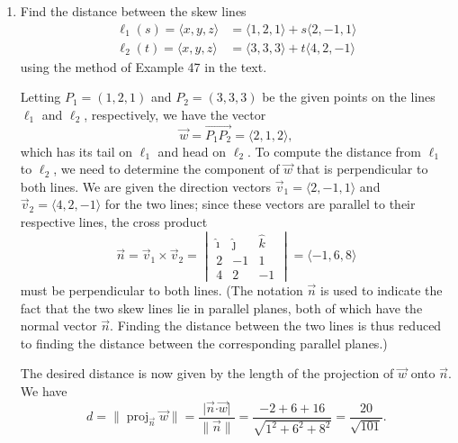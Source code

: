 \documentclass[12pt]{article}
\newcommand{\abs}[1]{\lvert #1\rvert}
\newcommand{\len}[1]{\lVert #1\rVert}
\newcommand{\dotp}{\boldsymbol{\cdot}}
\begin{document}
\begin{enumerate}
{\bf Note:} if we wanted only the distance but didn't need to find the point $P_1$, we can notice (from -- guess what? -- the diagram!) that the distance from the point $P$ to the line is given by the length of the vector $\overrightarrow{P_1P}$, and that 
\[
\overrightarrow{P_1P} = \overrightarrow{P_0P}-\overrightarrow{P_0P_1} = \langle -1, 3, -1\rangle - \langle -2, 2, 0\rangle = \langle 1, 1,  -1\rangle,
\]
and thus $d = \len{\overrightarrow{P_1P}} = \sqrt{1^2+1^2+(-1)^2} = \sqrt{3}$.

\newpage


\item Find the distance between the skew lines 
\begin{align*}
 \ell_1(s) = \langle x,y,z\rangle & = \langle 1,2,1\rangle+s\langle 2,-1,1\rangle\\
 \ell_2(t) = \langle x,y,z\rangle & = \langle 3,3,3\rangle+t\langle 4,2,-1\rangle
\end{align*}
using the method of Example 47 in the text. 

\bigskip

Letting $P_1 = (1,2,1)$ and $P_2=(3,3,3)$ be the given points on the lines $\ell_1$ and $\ell_2$, respectively, we have the vector 
\[
 \vec{w} = \overrightarrow{P_1P_2} = \langle 2,1,2\rangle,
\]
which has its tail on $\ell_1$ and head on $\ell_2$. To compute the distance from $\ell_1$ to $\ell_2$, we need to determine the component of $\vec{w}$ that is perpendicular to both lines. We are given the direction vectors $\vec{v}_1 = \langle 2,-1,1\rangle$ and $\vec{v}_2 = \langle 4,2,-1\rangle$ for the two lines; since these vectors are parallel to their respective lines, the cross product
\[
 \vec{n} = \vec{v}_1\times\vec{v}_2 = \begin{vmatrix}\hat{\imath}&\hat{\jmath}&\hat{k}\\2&-1&1\\4&2&-1\end{vmatrix} = \langle -1, 6, 8\rangle
\]
must be perpendicular to both lines. (The notation $\vec{n}$ is used to indicate the fact that the two skew lines lie in parallel planes, both of which have the normal vector $\vec{n}$. Finding the distance between the two lines is thus reduced to finding the distance between the corresponding parallel planes.)

The desired distance is now given by the length of the projection of $\vec{w}$ onto $\vec{n}$. We have
\[
 d = \len{\operatorname{proj}_{\vec{n}}\vec{w}} = \frac{\abs{\vec{n}\dotp\vec{w}}}{\len{\vec{n}}} = \frac{-2+6+16}{\sqrt{1^2+6^2+8^2}} = \frac{20}{\sqrt{101}}.
\]
\end{enumerate}
  
\end{document}
